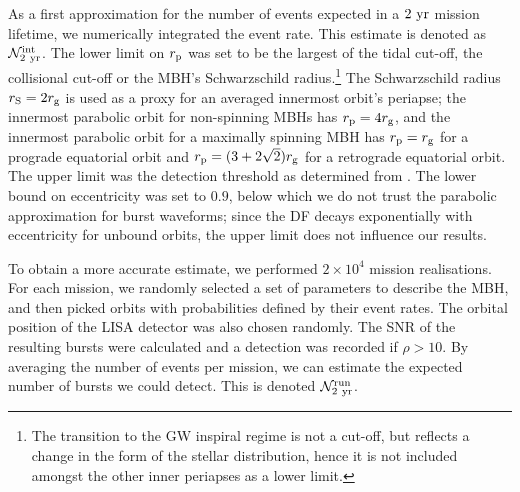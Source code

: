 As a first approximation for the number of events expected in a $2~\mathrm{yr}$ mission lifetime, we numerically integrated the event rate. This estimate is denoted as $\mathcal{N}_{2~\mathrm{yr}}^\mathrm{int}$. The lower limit on $r_\mathrm{p}$ was set to be the largest of the tidal cut-off, the collisional cut-off or the MBH's Schwarzschild radius.\footnote{The transition to the GW inspiral regime is not a cut-off, but reflects a change in the form of the stellar distribution, hence it is not included amongst the other inner periapses as a lower limit.} The Schwarzschild radius $r_\mathrm{S} = 2 r_\mathrm{g}$ is used as a proxy for an averaged innermost orbit's periapse; the innermost parabolic orbit for non-spinning MBHs has $r_\mathrm{p} = 4r_\mathrm{g}$, and the innermost parabolic orbit for a maximally spinning MBH has $r_\mathrm{p} = r_\mathrm{g}$ for a prograde equatorial orbit and $r_\mathrm{p} = (3 + 2\sqrt{2})r_\mathrm{g}$ for a retrograde equatorial orbit. The upper limit was the detection threshold as determined from . The lower bound on eccentricity was set to $0.9$, below which we do not trust the parabolic approximation for burst waveforms; since the DF decays exponentially with eccentricity for unbound orbits, the upper limit does not influence our results.

To obtain a more accurate estimate, we performed $2 \times 10^4$ mission realisations. For each mission, we randomly selected a set of parameters to describe the MBH, and then picked orbits with probabilities defined by their event rates. The orbital position of the LISA detector was also chosen randomly. The SNR of the resulting bursts were calculated and a detection was recorded if $\rho > 10$. By averaging the number of events per mission, we can estimate the expected number of bursts we could detect. This is denoted $\mathcal{N}_{2~\mathrm{yr}}^\mathrm{run}$.

